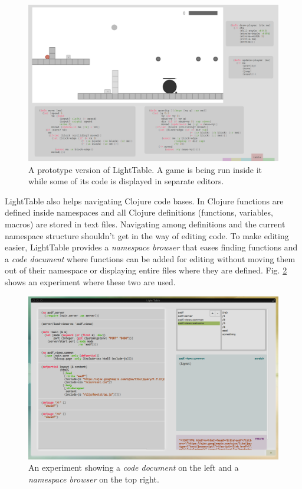 \documentclass{./llncs2e/llncs}
\begin{document}
	\begin{figure}
	  \centering
	  \includegraphics[width=1.0\textwidth]{img/lt_game_example__inv}
	    \caption{A prototype version of LightTable. A game is being run inside it while some of its code is displayed in separate editors.}
	  \label{fig:lt:draft:table}
	\end{figure} 

	LightTable also helps navigating Clojure code bases.
	In Clojure functions are defined inside namespaces and all Clojure definitions (functions, variables, macros) are stored in text files. 
	Navigating among definitions and the current namespace structure shouldn't get in the way of editing code. 
	To make editing easier, LightTable provides a \emph{namespace browser} that eases finding functions and a \emph{code document} where functions can be added for editing without moving them out of their namespace or displaying entire files where they are defined. 
	Fig. \ref{fig:lt:clojure:table} shows an experiment where these two are used.

	\begin{figure}
	  \centering
	  \includegraphics[width=1.0\textwidth]{img/lt_clojure_table__inv}
	    \caption{An experiment showing a \emph{code document} on the left and a \emph{namespace browser} on the top right.}
	  \label{fig:lt:clojure:table}
	\end{figure} 
\end{document}
